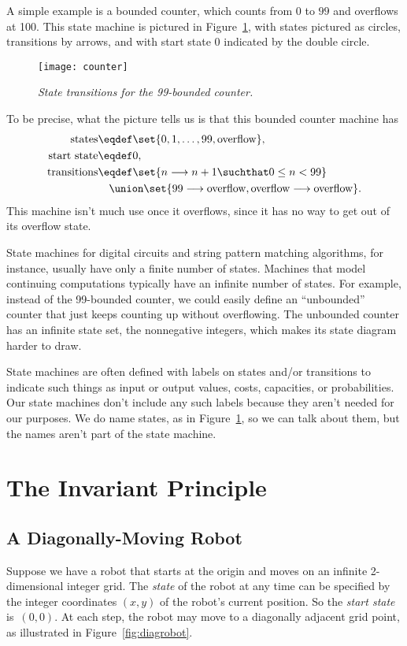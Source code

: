 A simple example is a bounded counter, which counts from $0$ to $99$
and overflows at 100.  This state machine is pictured in
Figure~\ref{fig:counter}, with states pictured as circles, transitions
by arrows, and with start state 0 indicated by the double circle.
\begin{figure}
\texttt{[image: counter]}
\caption{\em State transitions for the 99-bounded counter.}
\label{fig:counter}
\end{figure}
To be precise, what the picture tells us is that this bounded counter machine has
\begin{align*}
\text{states} &  \eqdef \set{0, 1,\dots,99, \text{overflow}},\\
\text{start state}  & \eqdef 0,\\
\text{transitions} & \eqdef \set{n \movesto n+1 \suchthat 0 \le n < 99}\\
                   &\quad  \union \set{99 \movesto \text{overflow},
                                 \text{overflow} \movesto \text{overflow}}.
\end{align*}
This machine isn't much use once it overflows, since it has no way to
get out of its overflow state.

State machines for digital circuits and string pattern matching
algorithms, for instance, usually have only a finite number of states.
Machines that model continuing computations typically have an infinite
number of states.  For example, instead of the 99-bounded counter, we
could easily define an ``unbounded'' counter that just keeps counting
up without overflowing.  The unbounded counter has an infinite state
set, the nonnegative integers, which makes its state diagram
harder to draw.

State machines are often defined with labels on states and/or transitions
to indicate such things as input or output values, costs, capacities, or
probabilities.  Our state machines don't include any such labels because
they aren't needed for our purposes.  We do name states, as in
Figure~\ref{fig:counter}, so we can talk about them, but the names aren't
part of the state machine.

\section{The Invariant Principle}

\subsection{A Diagonally-Moving Robot}
Suppose we have a robot that starts at the origin and moves on an
infinite 2-dimensional integer grid.  The \emph{state} of the robot at
any time can be specified by the integer coordinates $(x, y)$ of the
robot's current position.  So the \emph{start state} is~$(0, 0)$.  At
each step, the robot may move to a diagonally adjacent grid point, as
illustrated in Figure~\ref{fig:diagrobot}.

